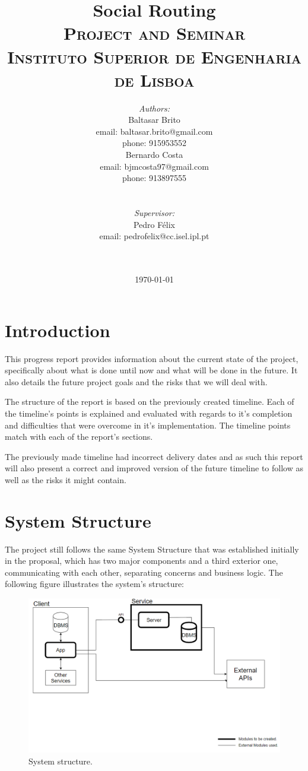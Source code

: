 \documentclass{article}
\title{
    \vspace{-4.0cm}
    {\Huge Social Routing}\\[0.5cm]    
    \textsc{\Large Project and Seminar}\\[0.5cm]
    \textsc{\large Instituto Superior de Engenharia de Lisboa}\\[0.5cm]
}
\date{\today}
\author{   
    \begin{minipage}{0.4\textwidth}
        \begin{flushleft} \large
        \emph{Authors:}\\
        Baltasar Brito\\
        {\small email: baltasar.brito@gmail.com}\\
        {\small phone: 915953552}\\
        Bernardo Costa\\
        {\small email: bjmcosta97@gmail.com}\\
        {\small phone: 913897555}\\
        \end{flushleft}
    \end{minipage}
    ~
    \begin{minipage}{0.4\textwidth}
        \begin{flushright} \large
        \emph{Supervisor:} \\ 
        Pedro Félix\\
        {\small email: pedrofelix@cc.isel.ipl.pt}\\  
        \end{flushright}
    \end{minipage}\\[2cm]  
}
\begin{document}
     
    
    \maketitle

    \newpage

    \tableofcontents

    \newpage

    \section{Introduction}
        This progress report provides information about the current state of the project, specifically about what is done until now and what will 
        be done in the future. It also details the future project goals and the risks that we will deal with.\par
        The structure of the report is based on the previously created timeline. Each of the timeline's points is explained and evaluated with regards to it's 
        completion and difficulties that were overcome in it's implementation. The timeline points match with each of the report's sections.\par
        The previously made timeline had incorrect delivery dates and as such this report will also present a correct and improved version 
        of the future timeline to follow as well as the risks it might contain.
        
        \newpage
    
    \section{System Structure}
        The project still follows the same System Structure that was established initially in the proposal, which has two major components and a 
        third exterior one, communicating with each other, separating concerns and business logic. The following figure illustrates the system's structure:
        
        \begin{figure}[h]            
            \includegraphics[width=\textwidth]{images/project-structure/system-structure.PNG}
            \caption{System structure.}
            \label{fig:systemstructure}
        \end{figure}  
        \newpage    
\end{document}
